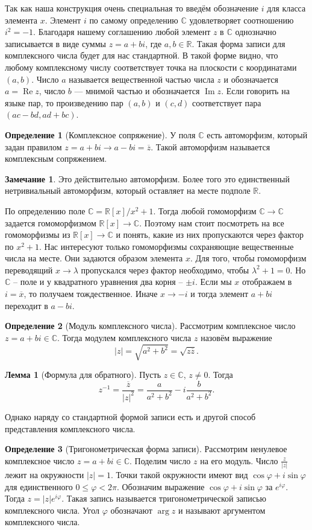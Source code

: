 \documentclass[10pt,a4paper,oneside]{book} %
\theoremstyle{definition}
\newtheorem*{rem}{Замечание}
\newtheorem*{defn}{Определение}
\newtheorem{lem}{Лемма}
\newcommand{\mb}[1]{\mathbb{#1}}
\newcommand{\ovl}{\overline}
\newcommand{\im}{\operatorname{Im}}
\newcommand{\re}{\operatorname{Re}}
\def\dfn{\begin{defn}}
\def\edfn{\end{defn}}
\def\lm{\begin{lem}}
\def\elm{\end{lem}}
\def\rm{\begin{rem}}
\def\erm{\end{rem}}
\begin{document}
Так как наша конструкция очень специальная то введём обозначение $i$ для класса элемента $x$. Элемент $i$ по самому определению $\mb C$ удовлетворяет соотношению $i^2=-1$. Благодаря нашему соглашению любой элемент $z$ в $\mb C$ однозначно записывается в виде суммы $z=a+bi$, где $a,b\in \mb R$. Такая форма записи для комплексного числа будет для нас стандартной. В такой форме видно, что любому комплексному числу соответствует точка на плоскости с координатами $(a,b)$. Число $a$ называется вещественной частью числа $z$ и обозначается $a=\re z$, число $b$ --- мнимой частью и обозначается $\im z$. Если говорить на языке пар, то произведению пар $(a,b)$ и $(c,d)$ соответствует пара $(ac-bd,ad+bc)$.
 
\dfn[Комплексное сопряжение] У поля $\mb C$ есть автоморфизм, который задан правилом $z=a+bi \to a-bi=\ovl{z}$. Такой автоморфизм называется комплексным сопряжением.
\edfn

\rm Это действительно автоморфизм. Более того это единственный нетривиальный автоморфизм, который оставляет на месте подполе $\mb R$.

\proof По определению поле $\mb C = \mb R[x]/x^2+1$. Тогда любой гомоморфизм $\mb C \to \mb C$ задается гомоморфизмом $\mb R[x]\to \mb C$. Поэтому нам стоит посмотреть на все гомоморфизмы из $\mb R[x]\to \mb C$ и понять, какие из них пропускаются через фактор по $x^2+1$. Нас интересуют только гомоморфизмы сохраняющие вещественные числа на месте. Они задаются образом элемента $x$. Для того, чтобы гомоморфизм переводящий $x \to \lambda$ пропускался через фактор необходимо, чтобы $\lambda^2+1=0$. Но $\mb C$ -- поле и у квадратного уравнения два корня -- $\pm i$. Если мы $x$ отображаем в $i=\ovl{x}$, то получаем тождественное. Иначе $x\to -i$ и тогда элемент $a+bi$ переходит в $a-bi$.
\endproof
\erm
 
\dfn[Модуль комплексного числа] Рассмотрим комплексное число $z=a+bi\in \mb C$. Тогда модулем комплексного числа $z$ назовём выражение
$$|z|=\sqrt{a^2+b^2}=\sqrt{z\ovl{z}}.$$
\edfn

\lm[Формула для обратного] Пусть $z\in \mb C$, $z\neq 0$. Тогда
$$ z^{-1} =\frac{\ovl{z}}{|z|^2}= \frac{a}{a^2+b^2}-i\frac{b}{a^2+b^2}.$$
\elm

Однако наряду со стандартной формой записи есть и другой способ представления комплексного числа.

\dfn[Тригонометрическая форма записи] Рассмотрим ненулевое комплексное число $z= a+bi\in\mb C$. Поделим число $z$ на его модуль. Число
$\frac{z}{|z|}$ лежит на окружности $|z| = 1$. Точки такой окружности имеют вид $\cos\varphi +i\sin\varphi$ для единственного $0 \leq \varphi < 2\pi$. Обозначим выражение $\cos\varphi+i\sin\varphi$ за $e^{i\varphi}$. Тогда $z=|z|e^{i\varphi}$.
Такая запись называется тригонометрической записью комплексного числа. Угол $\varphi$ обозначают $\arg z$ и называют
аргументом комплексного числа.
\edfn
\end{document}
